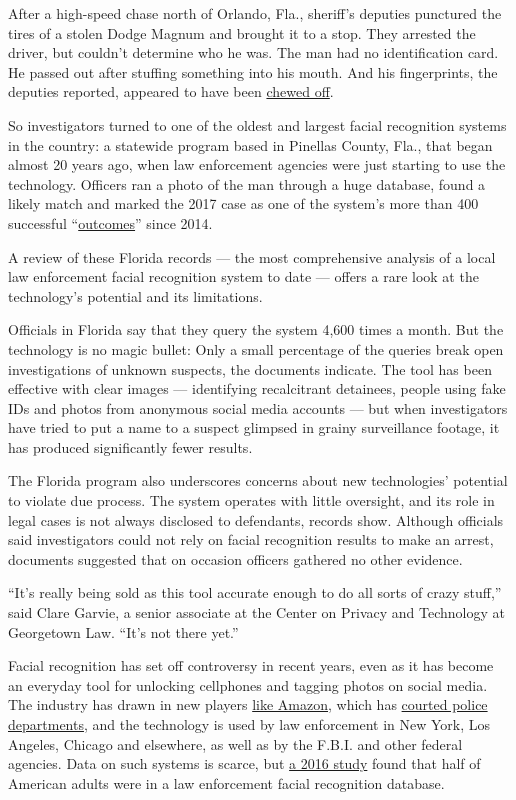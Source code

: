 After a high-speed chase north of Orlando, Fla., sheriff's deputies
punctured the tires of a stolen Dodge Magnum and brought it to a stop.
They arrested the driver, but couldn't determine who he was. The man had
no identification card. He passed out after stuffing something into his
mouth. And his fingerprints, the deputies reported, appeared to have
been
\href{https://www.documentcloud.org/documents/6581927-Seminolecountycarchase-Redacted.html}{chewed
off}.

So investigators turned to one of the oldest and largest facial
recognition systems in the country: a statewide program based in
Pinellas County, Fla., that began almost 20 years ago, when law
enforcement agencies were just starting to use the technology. Officers
ran a photo of the man through a huge database, found a likely match and
marked the 2017 case as one of the system's more than 400 successful
``\href{https://www.documentcloud.org/documents/6586379-FACESlist-Redacted.html}{outcomes}''
since 2014.

A review of these Florida records --- the most comprehensive analysis of
a local law enforcement facial recognition system to date --- offers a
rare look at the technology's potential and its limitations.

Officials in Florida say that they query the system 4,600 times a month.
But the technology is no magic bullet: Only a small percentage of the
queries break open investigations of unknown suspects, the documents
indicate. The tool has been effective with clear images --- identifying
recalcitrant detainees, people using fake IDs and photos from anonymous
social media accounts --- but when investigators have tried to put a
name to a suspect glimpsed in grainy surveillance footage, it has
produced significantly fewer results.

The Florida program also underscores concerns about new technologies'
potential to violate due process. The system operates with little
oversight, and its role in legal cases is not always disclosed to
defendants, records show. Although officials said investigators could
not rely on facial recognition results to make an arrest, documents
suggested that on occasion officers gathered no other evidence.

``It's really being sold as this tool accurate enough to do all sorts of
crazy stuff,'' said Clare Garvie, a senior associate at the Center on
Privacy and Technology at Georgetown Law. ``It's not there yet.''

Facial recognition has set off controversy in recent years, even as it
has become an everyday tool for unlocking cellphones and tagging photos
on social media. The industry has drawn in new players
\href{https://www.cnet.com/news/facial-recognition-overkill-how-deputies-solved-a-12-shoplifting-case/}{like
Amazon}, which has
\href{https://www.nytimes3xbfgragh.onion/2018/05/22/technology/amazon-facial-recognition.html}{courted
police departments}, and the technology is used by law enforcement in
New York, Los Angeles, Chicago and elsewhere, as well as by the F.B.I.
and other federal agencies. Data on such systems is scarce, but
\href{https://www.perpetuallineup.org/}{a 2016 study} found that half of
American adults were in a law enforcement facial recognition database.

